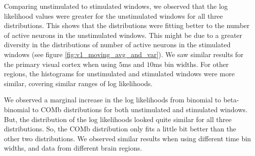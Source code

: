     Comparing unstimulated to stimulated windows, we observed that the log likelihood values were greater for the unstimulated windows for all three distributions. This shows that the distributions were fitting better to the number of active neurons in the unstimulated windows. This might be due to a greater diversity in the distributions of number of active neurons in the stimulated windows (see figure \ref{fig:v1_moving_avg_and_var}). We saw similar results for the primary visual cortex when using $5$ms and $10$ms bin widths. For other regions, the histograms for unstimulated and stimulated windows were more similar, covering similar ranges of log likelihoods.

    We observed a marginal increase in the log likelihoods from binomial to beta-binomial to COMb distributions for both unstimulated and stimulated windows. But, the distribution of the log likelihoods looked quite similar for all three distributions. So, the COMb distribution only fits a little bit better than the other two distributions. We observed similar results when using different time bin widths, and data from different brain regions.

